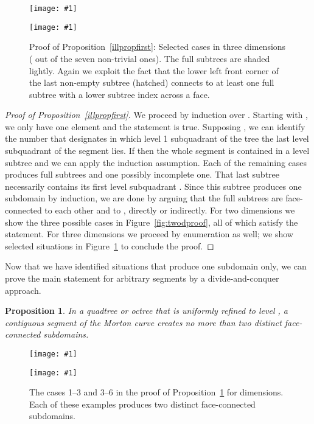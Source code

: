 \documentclass[a4paper,11pt]{article}
\newcommand{\inputtikz}[1]{\texttt{[image: \#1]}}
\newcommand{\figlab}[1]{\label{fig:#1}}
\newcommand{\figref}[1]{Figure~\ref{fig:#1}}
\newtheorem{prop}[thm]{Proposition}
\begin{document}
\begin{figure}\centering
\begin{minipage}{0.49\textwidth}\centering
    \inputtikz{threedproof1}
  \end{minipage}
  \begin{minipage}{0.49\textwidth}\centering
    \inputtikz{threedproof2}
  \end{minipage}
  \caption{Proof of Proposition~\ref{illpropfirst}:   Selected cases in three
    dimensions ( out of the seven non-trivial ones).  The full
    subtrees are shaded lightly.  Again we exploit the fact that the lower
    left front corner of the last non-empty subtree (hatched) connects to at
    least one full subtree with a lower subtree index across a face.}
  \figlab{threedproof}
\end{figure}
\begin{proof}[Proof of Proposition~\ref{illpropfirst}]
  We proceed by induction over .  Starting with , we only have one
  element and the statement is true.  Supposing , we can identify the
  number  that designates in which level 1
  subquadrant of the tree the last level  subquadrant of the segment lies.
  If  then the whole segment is contained in a level  subtree and
  we can apply the induction assumption.  Each of the remaining cases produces
   full subtrees and one possibly incomplete one.  That last subtree
  necessarily contains its first level  subquadrant .  Since this subtree
  produces one subdomain by induction, we are done by arguing that the full
  subtrees are face-connected to each other and to , directly or indirectly.
  For two dimensions we show the three possible cases in \figref{twodproof},
  all of which satisfy the statement.  For three dimensions we proceed by
  enumeration as well; we show selected situations in \figref{threedproof} to
  conclude the proof.
\end{proof}
Now that we have identified situations that produce one subdomain only, we can
prove the main statement for arbitrary segments by a divide-and-conquer
approach.
\begin{prop}
  \label{illpropboth}
  In a quadtree or octree that is uniformly refined to level , a contiguous
  segment of the Morton curve creates no more than two distinct face-connected
  subdomains.
\end{prop}
\begin{figure}\centering
\begin{minipage}{0.49\textwidth}\centering
    \inputtikz{threedcases1}
  \end{minipage}
  \begin{minipage}{0.49\textwidth}\centering
    \inputtikz{threedcases2}
  \end{minipage}
  \caption{The cases 1--3 and 3--6{} in the proof of
           Proposition~\ref{illpropboth} for  dimensions.  Each of these
           examples produces two distinct face-connected subdomains.}
  \figlab{threedcases}
\end{figure}
\end{document}
